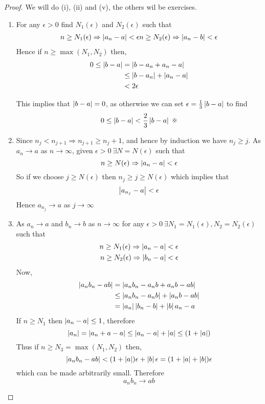 \documentclass{article}
\numberwithin{equation}{section}
\begin{document}
\begin{proof}
    We will do (i), (ii) and (v), the others wil be exercises.
    \begin{enumerate}
        \item For any $\epsilon >0$ find $N_1(\epsilon)$ and $N_2(\epsilon)$ such that
        \begin{align*}
            n \geq N_1(\epsilon) \Rightarrow \left\lvert a_n - a\right\rvert < \epsilon
            n \geq N_2(\epsilon) \Rightarrow \left\lvert a_n - b\right\rvert < \epsilon
        \end{align*}
        Hence if $n \geq \max(N_1, N_2)$ then,
        \begin{align*}
            0 \leq \left\lvert b - a\right\rvert &= \left\lvert b - a_n + a_n - a\right\rvert \\
            &\leq \left\lvert b - a_n\right\rvert + \left\lvert a_n - a\right\rvert \\
            &< 2\epsilon
        \end{align*}

        This implies that $\left\lvert b - a\right\rvert = 0$, as otherwise we can set $\epsilon = \frac{1}{3} \left\lvert b - a\right\rvert$ to find
        \[0 \leq \abs{b - a} < \frac{2}{3} \abs{b - a} \ \contradiction\]

        \item Since $n_j < n_{j + 1} \Rightarrow n_{j+1} \geq n_j + 1$, and hence by induction we have $n_j \geq j$.
        As $a_n \rightarrow a$ as $n \rightarrow \infty$, given $\epsilon >0 \ \exists N = N(\epsilon)$ such that
        \[n \geq N(\epsilon) \Rightarrow \left\lvert a_n - a\right\rvert < \epsilon\]
        So if we choose $j \geq N(\epsilon)$ then $n_j \geq j \geq N(\epsilon)$ which implies that
        \[\left\lvert a_{n_j} - a\right\rvert < \epsilon\]
        Hence $a_{n_j} \rightarrow a$ as $j \rightarrow \infty$
        
        \item As $a_n \rightarrow a$ and $b_n \rightarrow b$ as $n \rightarrow \infty$ for any $\epsilon > 0 \ \exists N_1 = N_1(\epsilon), N_2 = N_2(\epsilon)$
        such that
        \begin{align*}
            n \geq N_1(\epsilon) \Rightarrow \left\lvert a_n - a\right\rvert < \epsilon \\
            n \geq N_2(\epsilon) \Rightarrow \left\lvert b_n - a\right\rvert < \epsilon
        \end{align*}
        Now,
        \begin{align*}
            \left\lvert a_nb_n - ab\right\rvert &= \left\lvert a_nb_n - a_nb + a_nb - ab\right\rvert \\
            &\leq \left\lvert a_nb_n - a_nb\right\rvert + \left\lvert a_nb - ab\right\rvert \\
            &= \left\lvert a_n\right\rvert\left\lvert b_n - b\right\rvert + \left\lvert b\right\rvert{a_n -a}
        \end{align*}
        If $n \geq N_1$ then $\left\lvert a_n - a\right\rvert \leq 1$, therefore
        \[\left\lvert a_n\right\rvert = \left\lvert a_n + a - a\right\rvert \leq \left\lvert a_n - a\right\rvert + \left\lvert a\right\rvert \leq (1 + \left\lvert a\right\rvert)\]
        Thus if $n \geq N_3 = \max(N_1, N_2)$ then,
        \[\left\lvert a_nb_n - ab\right\rvert < (1 + \left\lvert a\right\rvert)\epsilon + \left\lvert b\right\rvert\epsilon = (1 + \left\lvert a\right\rvert + \left\lvert b\right\rvert)\epsilon\]
        which can be made arbitrarily small. 
        Therefore
        \[a_nb_n \rightarrow ab\]
    \end{enumerate}
\end{proof}
\end{document}
